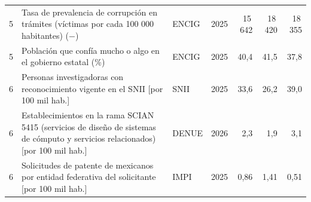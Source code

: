 {\begin{longtable}{@{}p{0.4cm}>{\raggedright\arraybackslash}p{4.75cm}>{\raggedright\arraybackslash}p{1.8cm}p{0.7cm}rrr@{}}
5 & Tasa de prevalencia de corrupción en trámites (víctimas por cada 100 000 habitantes) ($-$) & ENCIG & 2025 & 15\,642 & 18\,420 & 18\,355\\
5 & Población que confía mucho o algo en el gobierno estatal (\%) & ENCIG & 2025 & 40{,}4 & 41{,}5 & 37{,}8\\
6 & Personas investigadoras con reconocimiento vigente en el SNII [por 100 mil hab.] & SNII & 2025 & 33{,}6 & 26{,}2 & 39{,}0\\
6 & Establecimientos en la rama SCIAN 5415 (servicios de diseño de sistemas de cómputo y servicios relacionados) [por 100 mil hab.] & DENUE & 2026 & 2{,}3 & 1{,}9 & 3{,}1\\
6 & Solicitudes de patente de mexicanos por entidad federativa del solicitante [por 100 mil hab.] & IMPI & 2025 & 0{,}86 & 1{,}41 & 0{,}51\\
\end{longtable}
}

